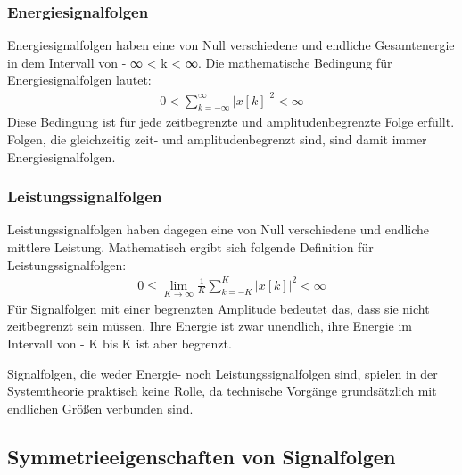 \subsubsection{Energiesignalfolgen}\label{sec:energiesignalfolgen}

Energiesignalfolgen haben eine von Null verschiedene und endliche Gesamtenergie in dem Intervall von - ∞ \textless{} k \textless{} ∞. Die mathematische Bedingung für Energiesignalfolgen lautet:
\begin{align}
0 < \sum\limits_{k = - \infty}^{\infty}\left| x[ k] \right|^{2} < \infty \label{eq:3.9}
\end{align}
Diese Bedingung ist für jede zeitbegrenzte und amplitudenbegrenzte Folge erfüllt. Folgen, die gleichzeitig zeit- und amplitudenbegrenzt sind, sind damit immer Energiesignalfolgen.

\subsubsection{Leistungssignalfolgen}\label{sec:leistungssignalfolgen}

Leistungssignalfolgen haben dagegen eine von Null verschiedene und endliche mittlere Leistung. Mathematisch ergibt sich folgende Definition für Leistungssignalfolgen:
\begin{align}
0 \leq \lim_{K \rightarrow \infty}\frac{1}{K}  \sum\limits_{k = - K}^{K}\left| x[ k] \right|^{2} < \infty \label{eq:3.10}
\end{align}
Für Signalfolgen mit einer begrenzten Amplitude bedeutet das, dass sie nicht zeitbegrenzt sein müssen. Ihre Energie ist zwar unendlich, ihre Energie im Intervall von - K bis K ist aber begrenzt.

Signalfolgen, die weder Energie- noch Leistungssignalfolgen sind, spielen in der Systemtheorie praktisch keine Rolle, da technische Vorgänge grundsätzlich mit endlichen Größen verbunden sind.

\subsection{Symmetrieeigenschaften von Signalfolgen}\label{sec:symmetrieeigenschaften-von-signalfolgen}

